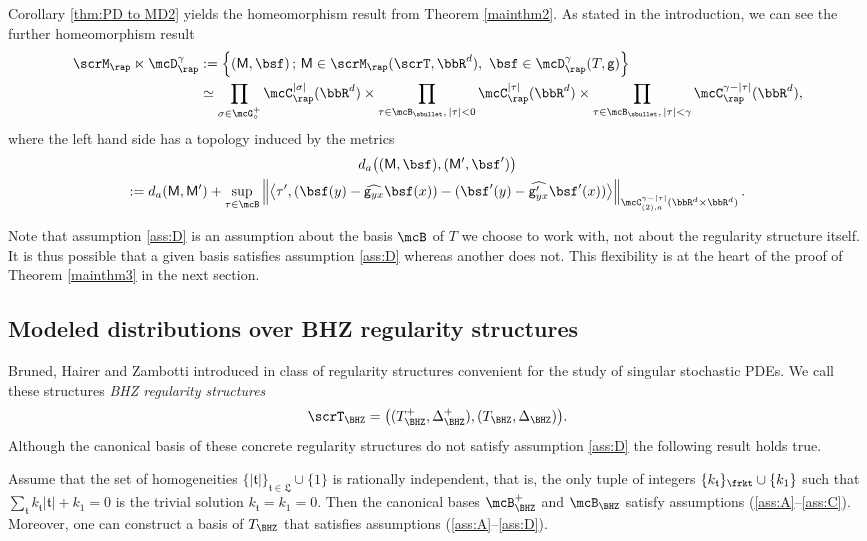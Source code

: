 Corollary \ref{thm:PD to MD2} yields the homeomorphism result from Theorem \ref{mainthm2}. As stated in the introduction, we can see the further homeomorphism result
\begin{align*}
\scrM_{\rap}\ltimes\mcD_{\rap}^\gamma
&:=\left\{
({\sf M},\bsf)\,;\, {\sf M}\in\scrM_{\rap}(\scrT,\bbR^d),\ \bsf\in\mcD_{\rap}^\gamma(T,{\sf g}) \right\}\\
&\simeq
\prod_{\sigma\in\mcG_\circ^+} \mcC_\rap^{|\sigma|}(\bbR^d) \times \prod_{\tau\in\mcB_\sbullet,\,|\tau|<0} \mcC_\rap^{|\tau|}(\bbR^d)
\times \prod_{\tau\in\mcB_\sbullet,\, |\tau|<\gamma} \mcC_\rap^{\gamma-|\tau|}(\bbR^d),
\end{align*}
where the left hand side has a topology induced by the metrics
\begin{multline*}
d_a\bigl(({\sf M},\bsf),({\sf M}',\bsf') \bigr)\\
:=d_a({\sf M},{\sf M}')
+\sup_{\tau\in\mcB}\left\| \big\langle \tau',
(\bsf(y)-\widehat{{\sf g}_{yx}}\bsf(x))-(\bsf'(y)-\widehat{{\sf g}'_{yx}}\bsf'(x))
\big\rangle \right\|_{\mcC_{(2),a}^{\gamma-|\tau|}(\bbR^d\times\bbR^d)}.
\end{multline*}

Note that assumption \eqref{ass:D} is an assumption about the basis $\mcB$ of $T$ we choose to work with, not about the regularity structure itself. It is thus possible that a given basis satisfies assumption \eqref{ass:D} whereas another does not. This flexibility is at the heart of the proof of Theorem \ref{mainthm3} in the next section.

\subsection{Modeled distributions over BHZ regularity structures}
\label{SubsectionBHZ-RS}

Bruned, Hairer and Zambotti introduced in \cite{BHZ} class of regularity structures convenient for the study of singular stochastic PDEs. We call these structures \emph{BHZ regularity structures}
\[
\scrT_\BHZ = \bigl((T_{\BHZ}^+,\Delta^+_{\BHZ}), (T_{\BHZ},\Delta_{\BHZ})\bigr).
\]
Although the canonical basis of these concrete regularity structures do not satisfy assumption \eqref{ass:D} the following result holds true.

\begin{thm} \label{prop:reduction of antiderivative}
Assume that the set of homogeneities $\{|\mathfrak{t}|\}_{\mathfrak{t}\in\mathfrak{L}}\cup\{1\}$ is rationally independent, that is, the only tuple of integers $\{k_{\mathfrak{t}}\}_{\frkt}\cup\{k_1\}$ such that $\sum_{\mathfrak{t}}k_{\mathfrak{t}}|\mathfrak{t}|+k_1=0$ is the trivial solution $k_{\mathfrak{t}}=k_1=0$. Then the canonical bases $\mcB_{\BHZ}^+$ and $\mcB_{\BHZ}$ satisfy assumptions \textup{(\ref{ass:A}--\ref{ass:C})}.
Moreover, one can construct a basis of $T_{\BHZ}$ that satisfies assumptions \textup{(\ref{ass:A}--\ref{ass:D})}.
\end{thm}


